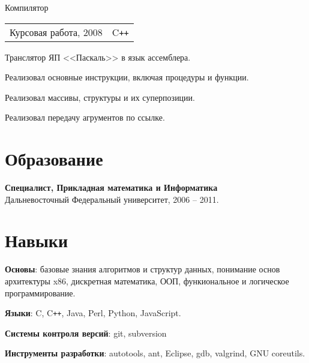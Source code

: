 \documentclass[a4paper]{article}
\begin{document}
\begin{multicols}{2}
		\begin{project2}{Компилятор}{\begin{tabular}{@{}l|l}Курсовая работа, 2008 & C\texttt{++}\\\end{tabular}}
			Транслятор ЯП <<Паскаль>> в язык ассемблера.
			\begin{items}
				\item Реализовал основные инструкции, включая процедуры и функции.
				\item Реализовал массивы, структуры и их суперпозиции.
				\item Реализовал передачу агрументов по ссылке.
			\end{items}
		\end{project2}
	\end{multicols}

	\section{Образование}
			\begin{items}
				\item \textbf{Специалист, Прикладная математика и Информатика}\\
				Дальневосточный Федеральный университет, 2006 -- 2011.
			\end{items}
			\hspace{10mm}

	\section{Навыки}
	\begin{multicols}{2}
		\raggedcolumns
		\begin{items}
			\item \textbf{Основы}: базовые знания алгоритмов и структур данных, понимание основ архитектуры x86, дискретная математика, ООП, функиональное и логическое программирование.
			\item \textbf{Языки}: C, C\texttt{++}, Java, Perl, Python, JavaScript.
			\columnbreak
			\item \textbf{Системы контроля версий}: git, subversion
			\item \textbf{Инструменты разработки}: autotools, ant, Eclipse, gdb, valgrind, GNU coreutils.
		\end{items}
	\end{multicols}
\end{document}
